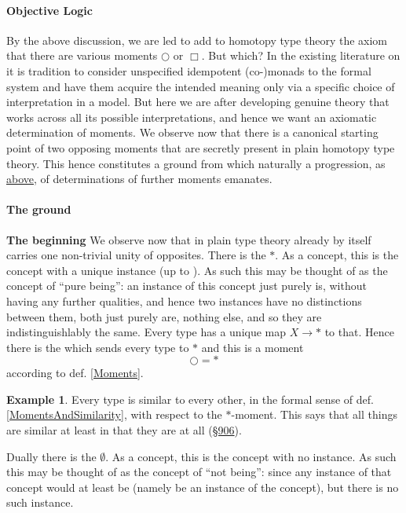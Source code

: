 \documentclass[12pt,titlepage]{article}
\theoremstyle{plain}
\theoremstyle{definition}
\newtheorem{example}{Example}
\theoremstyle{remark}
\begin{document}
\hypertarget{ObjectiveLogic}{}\paragraph*{{Objective Logic}}\label{ObjectiveLogic}
By the above discussion, we are led to add to homotopy type theory the axiom that there are various moments $\bigcirc$ or $\Box$. But which?
In the existing literature on  it is tradition to consider unspecified idempotent (co-)monads to the formal system and have them acquire the intended meaning only via a specific choice of interpretation in a model. But here we are after developing genuine theory that works across all its possible interpretations, and hence we want an axiomatic determination of moments.
We observe now that there is a canonical starting point of two opposing moments that are secretly present in plain homotopy type theory. This hence constitutes a ground from which naturally a progression, as \hyperlink{Progression}{above}, of determinations of further moments emanates.
\hypertarget{TheGround}{}\paragraph*{{The ground}}\label{TheGround}
\textbf{The beginning}
We observe now that in plain type theory already by itself carries one non-trivial unity of opposites.
There is the  $\ast$. As a concept, this is the concept with a unique instance (up to ). As such this may be thought of as the concept of ``pure being'': an instance of this concept just purely is, without having any further qualities, and hence two instances have no distinctions between them, both just purely are, nothing else, and so they are indistinguishlably the same.
Every type has a unique map $X\to \ast$ to that. Hence there is the  which sends every type to $\ast$ and this is a moment
\begin{displaymath}
\bigcirc = \ast
\end{displaymath}
according to def. \ref{Moments}.
\begin{example}
\label{SimilarityWithRespectToPureBeing}\hypertarget{SimilarityWithRespectToPureBeing}{}
Every type is similar to every other, in the formal sense of def. \ref{MomentsAndSimilarity}, with respect to the $\ast$-moment. This says that all things are similar at least in that they are at all (\hyperlink{906}{§906}).
\end{example}
Dually there is the  $\emptyset$. As a concept, this is the concept with no instance. As such this may be thought of as the concept of ``not being'': since any instance of that concept would at least be (namely be an instance of the concept), but there is no such instance.
\end{document}
